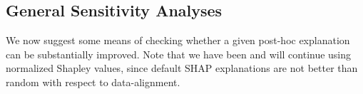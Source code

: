 \documentclass[mnsc,blindrev]{informs3}
\begin{document}
                

                
    \subsection{General Sensitivity Analyses}
        We now suggest some means of checking whether a given post-hoc explanation can be substantially improved. Note that we have been and will continue using normalized Shapley values, since default SHAP explanations are not better than random with respect to data-alignment. %
\end{document}
